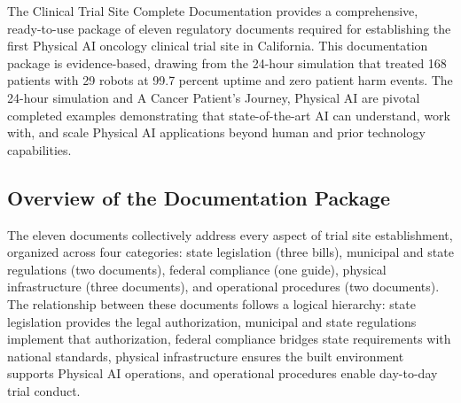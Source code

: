 
The Clinical Trial Site Complete Documentation \cite{site-docs} provides a
comprehensive, ready-to-use package of eleven regulatory documents required for
establishing the first Physical AI oncology clinical trial site in California.
This documentation package is evidence-based, drawing from the 24-hour
simulation that treated 168 patients with 29 robots at 99.7 percent uptime and
zero patient harm events. The 24-hour simulation and A Cancer Patient's
Journey, Physical AI \cite{patient-journey-paper} are pivotal completed
examples demonstrating that state-of-the-art AI can understand, work with, and
scale Physical AI applications beyond human and prior technology capabilities.

\subsection{Overview of the Documentation Package}
\label{subsec:site-overview}

The eleven documents collectively address every aspect of trial site
establishment, organized across four categories: state legislation (three
bills), municipal and state regulations (two documents), federal compliance
(one guide), physical infrastructure (three documents), and operational
procedures (two documents). The relationship between these documents follows a
logical hierarchy: state legislation provides the legal authorization, municipal
and state regulations implement that authorization, federal compliance bridges
state requirements with national standards, physical infrastructure ensures the
built environment supports Physical AI operations, and operational procedures
enable day-to-day trial conduct.

